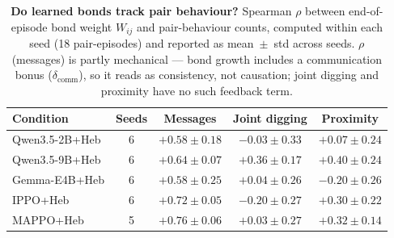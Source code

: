 \begin{table}[t]
\centering
\caption{\textbf{Do learned bonds track pair behaviour?} Spearman
$\rho$ between end-of-episode bond weight $W_{ij}$ and pair-behaviour
counts, computed within each seed (18 pair-episodes) and reported as
mean~$\pm$~std across seeds. $\rho$(messages) is partly mechanical ---
bond growth includes a communication bonus ($\delta_{\mathrm{comm}}$),
so it reads as consistency, not causation; joint digging and proximity
have no such feedback term.}
\label{tab:bond_behavior}
\small
\begin{tabular}{lcccc}
\toprule
Condition & Seeds & Messages & Joint digging & Proximity \\
\midrule
Qwen3.5-2B+Heb   & 6 & $+0.58 \pm 0.18$ & $-0.03 \pm 0.33$ & $+0.07 \pm 0.24$ \\
Qwen3.5-9B+Heb   & 6 & $+0.64 \pm 0.07$ & $+0.36 \pm 0.17$ & $+0.40 \pm 0.24$ \\
Gemma-E4B+Heb    & 6 & $+0.58 \pm 0.25$ & $+0.04 \pm 0.26$ & $-0.20 \pm 0.26$ \\
IPPO+Heb         & 6 & $+0.72 \pm 0.05$ & $-0.20 \pm 0.27$ & $+0.30 \pm 0.22$ \\
MAPPO+Heb        & 5 & $+0.76 \pm 0.06$ & $+0.03 \pm 0.27$ & $+0.32 \pm 0.14$ \\
\bottomrule
\end{tabular}
\end{table}
